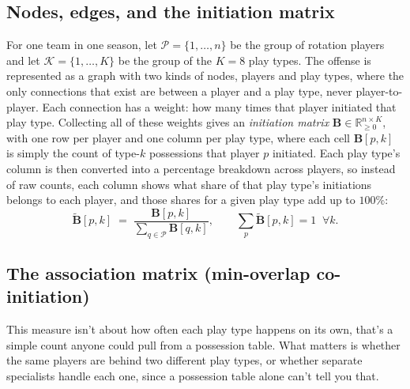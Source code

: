 \documentclass[11pt]{article}
\newcommand{\Bmat}{\ensuremath{\bm{B}}} %
\begin{document}
\subsection{Nodes, edges, and the initiation matrix}
\label{sec:nodes}

For one team in one season, let $\mathcal{P}=\{1,\dots,n\}$ be the group of rotation players
and let $\mathcal{K}=\{1,\dots,K\}$ be the group of the $K=8$ play types. The offense is
represented as a graph with two kinds of nodes, players and play types, where the only
connections that exist are between a player and a play type, never player-to-player. Each
connection has a weight: how many times that player initiated that play type. Collecting all
of these weights gives an \emph{initiation matrix}
$\Bmat\in\mathbb{R}_{\ge 0}^{n\times K}$, with one row per player and one column per play
type, where each cell $\Bmat[p,k]$ is simply the count of type-$k$ possessions that player
$p$ initiated.
Each play type's column is then converted into a percentage breakdown across players, so
instead of raw counts, each column shows what share of that play type's initiations belongs
to each player, and those shares for a given play type add up to $100\%$:
\begin{equation}
\label{eq:bnorm}
\tilde{\Bmat}[p,k] \;=\; \frac{\Bmat[p,k]}{\sum_{q\in\mathcal{P}}\Bmat[q,k]},
\qquad \sum_{p}\tilde{\Bmat}[p,k]=1 \;\;\forall k .
\end{equation}

\subsection{The association matrix (min-overlap co-initiation)}
\label{sec:assoc}

This measure isn't about how often each play type happens on its own, that's a simple count
anyone could pull from a possession table. What matters is whether the same players are
behind two different play types, or whether separate specialists handle each one, since a
possession table alone can't tell you that.
\end{document}
